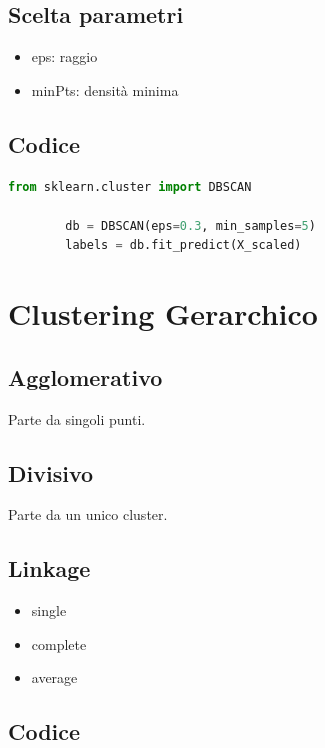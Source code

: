 \documentclass[12pt,a4paper]{article}
\begin{document}
	\subsection{Scelta parametri}
	
	\begin{itemize}
		\item eps: raggio
		\item minPts: densità minima
	\end{itemize}
	
	\subsection{Codice}
	
	\begin{lstlisting}[language=Python]
		from sklearn.cluster import DBSCAN
		
		db = DBSCAN(eps=0.3, min_samples=5)
		labels = db.fit_predict(X_scaled)
	\end{lstlisting}
	
	\section{Clustering Gerarchico}
	
	\subsection{Agglomerativo}
	
	Parte da singoli punti.
	
	\subsection{Divisivo}
	
	Parte da un unico cluster.
	
	\subsection{Linkage}
	
	\begin{itemize}
		\item single
		\item complete
		\item average
	\end{itemize}
	
	\subsection{Codice}
	
\end{document}

